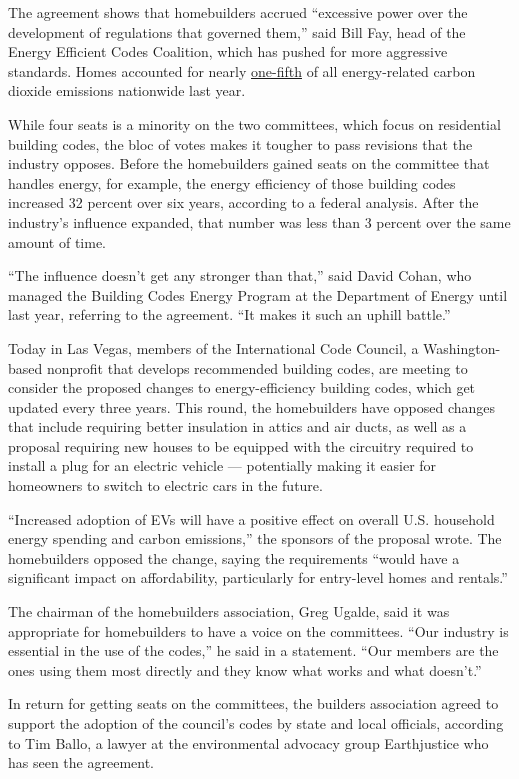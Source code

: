 The agreement shows that homebuilders accrued ``excessive power over the
development of regulations that governed them,'' said Bill Fay, head of
the Energy Efficient Codes Coalition, which has pushed for more
aggressive standards. Homes accounted for nearly
\href{https://www.eia.gov/tools/faqs/faq.php?id=75\&t=11}{one-fifth} of
all energy-related carbon dioxide emissions nationwide last year.

While four seats is a minority on the two committees, which focus on
residential building codes, the bloc of votes makes it tougher to pass
revisions that the industry opposes. Before the homebuilders gained
seats on the committee that handles energy, for example, the energy
efficiency of those building codes increased 32 percent over six years,
according to a federal analysis. After the industry's influence
expanded, that number was less than 3 percent over the same amount of
time.

``The influence doesn't get any stronger than that,'' said David Cohan,
who managed the Building Codes Energy Program at the Department of
Energy until last year, referring to the agreement. ``It makes it such
an uphill battle.''

Today in Las Vegas, members of the International Code Council, a
Washington-based nonprofit that develops recommended building codes, are
meeting to consider the proposed changes to energy-efficiency building
codes, which get updated every three years. This round, the homebuilders
have opposed changes that include requiring better insulation in attics
and air ducts, as well as a proposal requiring new houses to be equipped
with the circuitry required to install a plug for an electric vehicle
--- potentially making it easier for homeowners to switch to electric
cars in the future.

``Increased adoption of EVs will have a positive effect on overall U.S.
household energy spending and carbon emissions,'' the sponsors of the
proposal wrote. The homebuilders opposed the change, saying the
requirements ``would have a significant impact on affordability,
particularly for entry-level homes and rentals.''

The chairman of the homebuilders association, Greg Ugalde, said it was
appropriate for homebuilders to have a voice on the committees. ``Our
industry is essential in the use of the codes,'' he said in a statement.
``Our members are the ones using them most directly and they know what
works and what doesn't.''

In return for getting seats on the committees, the builders association
agreed to support the adoption of the council's codes by state and local
officials, according to Tim Ballo, a lawyer at the environmental
advocacy group Earthjustice who has seen the agreement.

